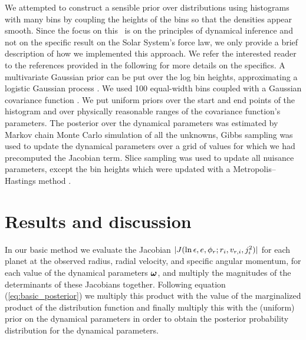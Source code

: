 We attempted to construct a sensible prior over distributions using
histograms with many bins by coupling the heights of the bins so that
the densities appear smooth. Since the focus on this \chaptername\ is
on the principles of dynamical inference and not on the specific
result on the Solar System's force law, we only provide a brief
description of how we implemented this approach. We refer the
interested reader to the references provided in the following for more
details on the specifics. A multivariate Gaussian prior can be put
over the log bin heights, approximating a logistic Gaussian process
\citep{leonard1978}. We used 100 equal-width bins coupled with a
Gaussian covariance function \citep{rasmussen2005a}. We put uniform
priors over the start and end points of the histogram and over
physically reasonable ranges of the covariance function's parameters.
The posterior over the dynamical parameters was estimated by Markov
chain Monte Carlo simulation of all the unknowns, Gibbs sampling was
used to update the dynamical parameters over a grid of values for
which we had precomputed the Jacobian term. Slice sampling
\citep{neal2003a} was used to update all nuisance parameters, except
the bin heights which were updated with a Metropolis--Hastings method
\citep[Eq.~15]{neal1999a}.

\section{Results and discussion}

In our basic method we evaluate the Jacobian $|J(\ln
\epsilon,e,\phi_r;r_i,v_{r,i},j_i^2)|$ for each planet at the
observed radius, radial velocity, and specific angular momentum, for
each value of the dynamical parameters $\boldsymbol{{\omega}}$, and multiply the
magnitudes of the determinants of these Jacobians together. Following
equation (\ref{eq:basic_posterior}) we multiply this product with the
value of the marginalized product of the distribution function and
finally multiply this with the (uniform) prior on the dynamical
parameters in order to obtain the posterior probability distribution
for the dynamical parameters.

